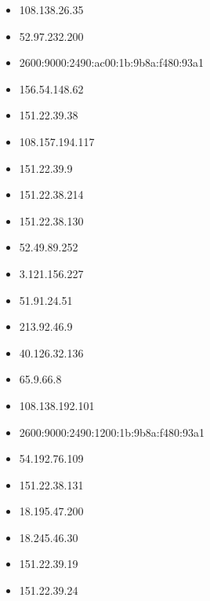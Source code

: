 \documentclass{article}
\begin{document}
\begin{itemize}
        \item 108.138.26.35
    
        \item 52.97.232.200
    
        \item 2600:9000:2490:ac00:1b:9b8a:f480:93a1
    
        \item 156.54.148.62
    
        \item 151.22.39.38
    
        \item 108.157.194.117
    
        \item 151.22.39.9
    
        \item 151.22.38.214
    
        \item 151.22.38.130
    
        \item 52.49.89.252
    
        \item 3.121.156.227
    
        \item 51.91.24.51
    
        \item 213.92.46.9
    
        \item 40.126.32.136
    
        \item 65.9.66.8
    
        \item 108.138.192.101
    
        \item 2600:9000:2490:1200:1b:9b8a:f480:93a1
    
        \item 54.192.76.109
    
        \item 151.22.38.131
    
        \item 18.195.47.200
    
        \item 18.245.46.30
    
        \item 151.22.39.19
    
        \item 151.22.39.24
    

\end{itemize}
\end{document}

